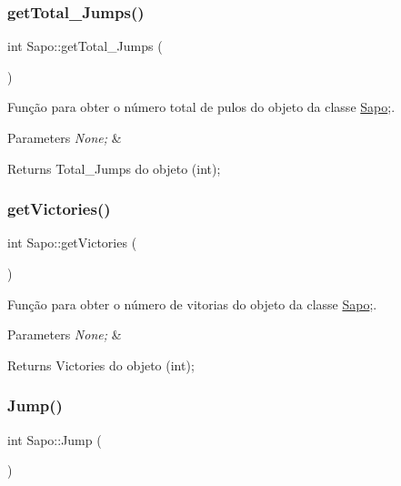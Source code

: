 \subsubsection{\texorpdfstring{get\+Total\+\_\+\+Jumps()}{getTotal\_Jumps()}}
{\footnotesize\ttfamily int Sapo\+::get\+Total\+\_\+\+Jumps (\begin{DoxyParamCaption}{ }\end{DoxyParamCaption})}



Função para obter o número total de pulos do objeto da classe \mbox{\hyperlink{class_sapo}{Sapo}};. 


\begin{DoxyParams}{Parameters}
{\em None;} & \\
\hline
\end{DoxyParams}
\begin{DoxyReturn}{Returns}
Total\+\_\+\+Jumps do objeto (int); 
\end{DoxyReturn}
\mbox{\label{class_sapo_a43fa127a1d4524632ee117b2648e4508}} 
\subsubsection{\texorpdfstring{get\+Victories()}{getVictories()}}
{\footnotesize\ttfamily int Sapo\+::get\+Victories (\begin{DoxyParamCaption}{ }\end{DoxyParamCaption})}



Função para obter o número de vitorias do objeto da classe \mbox{\hyperlink{class_sapo}{Sapo}};. 


\begin{DoxyParams}{Parameters}
{\em None;} & \\
\hline
\end{DoxyParams}
\begin{DoxyReturn}{Returns}
Victories do objeto (int); 
\end{DoxyReturn}
\mbox{\label{class_sapo_ae9f85bbb030b0b4e7a47ed2448e688e4}} 
\subsubsection{\texorpdfstring{Jump()}{Jump()}}
{\footnotesize\ttfamily int Sapo\+::\+Jump (\begin{DoxyParamCaption}{ }\end{DoxyParamCaption})}



